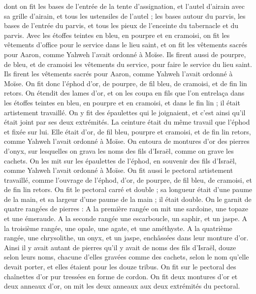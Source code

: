 \begin{multicols}{2}
dont on fit les bases de l’entrée de la tente d'assignation, et l'autel d'airain avec sa grille d'airain, et tous les ustensiles de l'autel ;
les bases autour du parvis, les bases de l’entrée du parvis, et tous les pieux de l’enceinte du tabernacle et du parvis. Avec les étoffes teintes en bleu, en pourpre et en cramoisi, on fit les vêtements d’office pour le service dans le lieu saint, et on fit les vêtements sacrés pour Aaron, comme Yahweh l’avait ordonné à Moïse.
\VerseOne{}Ils firent aussi de pourpre, de bleu, et de cramoisi les vêtements du service, pour faire le service du lieu saint. Ils firent les vêtements sacrés pour Aaron, comme Yahweh l'avait ordonné à Moïse\FTNT{}.
On fit donc l'éphod d'or, de pourpre, de fil bleu, de cramoisi, et de fin lin retors.
On étendit des lames d'or, et on les coupa en fils que l’on entrelaça dans les étoffes teintes en bleu, en pourpre et en cramoisi, et dans le fin lin ; il était artistement travaillé.
On y fit des épaulettes qui le joignaient, et c’est ainsi qu’il était joint par ses deux extrémités.
La ceinture était du même travail que l’éphod et fixée sur lui. Elle était d’or, de fil bleu, pourpre et cramoisi, et de fin lin retors, comme Yahweh l'avait ordonné à Moïse.
On entoura de montures d’or des pierres d’onyx, sur lesquelles on grava les noms des fils d’Israël, comme on grave les cachets.
On les mit sur les épaulettes de l'éphod, en souvenir des fils d'Israël, comme Yahweh l’avait ordonné à Moïse.
On fit aussi le pectoral artistement travaillé, comme l'ouvrage de l'éphod, d'or, de pourpre, de fil bleu, de cramoisi, et de fin lin retors.
On fit le pectoral carré et double ; sa longueur était d'une paume de la main, et sa largeur d'une paume de la main ; il était double.
On le garnit de quatre rangées de pierres : A la première rangée on mit une sardoine, une topaze et une émeraude.
A la seconde rangée une escarboucle, un saphir, et un jaspe.
A la troisième rangée, une opale, une agate, et une améthyste.
A la quatrième rangée, une chrysolithe, un onyx, et un jaspe\FTNT{}, enchâssées dans leur monture d’or.
Ainsi il y avait autant de pierres qu'il y avait de noms des fils d'Israël, douze selon leurs noms, chacune d'elles gravées comme des cachets, selon le nom qu'elle devait porter, et elles étaient pour les douze tribus.
On fit sur le pectoral des chaînettes d’or pur tressées en forme de cordon.
On fit deux montures d'or et deux anneaux d'or, on mit les deux anneaux aux deux extrémités du pectoral.

\end{multicols}
